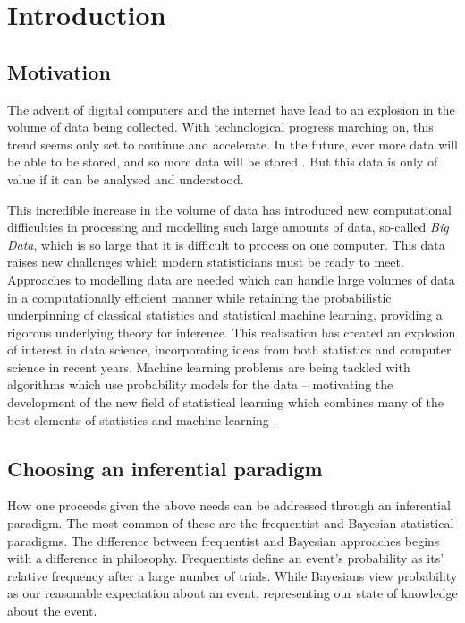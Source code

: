 \chapter{Introduction}

\section{Motivation}

The advent of digital computers and the internet have lead to an explosion in
the volume of data being collected. With technological progress marching on,
this trend seems only set to continue and accelerate. In the future, ever more
data will be able to be stored, and so more data will be stored
\citep{Gandomi2015}. But this data is only of value if it can be analysed and
understood.

This incredible increase in the volume of data has introduced new computational
difficulties in processing and modelling such large amounts of data, so-called
\emph{Big Data}, which is so large that it is difficult to process on one
computer. This data raises new challenges which modern statisticians must be
ready to meet. Approaches to modelling data are needed which can handle large
volumes of data in a computationally efficient manner while retaining the
probabilistic underpinning of classical statistics and statistical machine
learning, providing a rigorous underlying theory for inference. This realisation
has created an explosion of interest in data science, incorporating ideas from
both statistics and computer science in recent years. Machine learning problems
are being tackled with algorithms which use probability models for the data --
motivating the development of the new field of statistical learning which
combines many of the best elements of statistics and machine learning
\citep{James:2014:ISL:2517747, MacKay:2002:ITI:971143,
hastie01statisticallearning, Murphy:2012:MLP:2380985}.

\section{Choosing an inferential paradigm}

How one proceeds given the above needs can be addressed through an inferential
paradigm. The most common of these are  the frequentist and Bayesian statistical
paradigms. The difference between frequentist and Bayesian approaches begins
with a difference in philosophy. Frequentists define an event's probability as
its' relative frequency after a large number of trials. While Bayesians view
probability as our reasonable expectation about an event, representing our state
of knowledge about the event.


